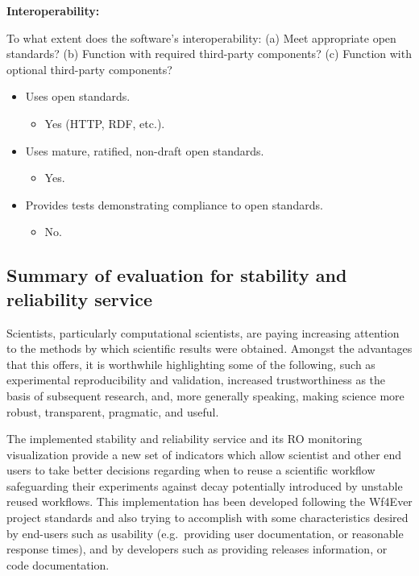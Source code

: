 \textbf{Interoperability:}

To what extent does the software's interoperability: (a) Meet
appropriate open standards? (b) Function with required third-party
components? (c) Function with optional third-party components?

\begin{itemize}
\itemsep1pt\parskip0pt
\item
  Uses open standards.

  \begin{itemize}
  \itemsep1pt\parskip0pt
  \item
    Yes (HTTP, RDF, etc.).
  \end{itemize}
\item
  Uses mature, ratified, non-draft open standards.

  \begin{itemize}
  \itemsep1pt\parskip0pt
  \item
    Yes.
  \end{itemize}
\item
  Provides tests demonstrating compliance to open standards.

  \begin{itemize}
  \itemsep1pt\parskip0pt
  \item
    No.
  \end{itemize}
\end{itemize}

\subsection{Summary of evaluation for stability and reliability service}

Scientists, particularly computational scientists, are paying increasing
attention to the methods by which scientific results were obtained.
Amongst the advantages that this offers, it is worthwhile highlighting
some of the following, such as experimental reproducibility and
validation, increased trustworthiness as the basis of subsequent
research, and, more generally speaking, making science more robust,
transparent, pragmatic, and useful.

The implemented stability and reliability service and its RO monitoring
visualization provide a new set of indicators which allow scientist and
other end users to take better decisions regarding when to reuse a
scientific workflow safeguarding their experiments against decay
potentially introduced by unstable reused workflows. This implementation
has been developed following the Wf4Ever project standards and also
trying to accomplish with some characteristics desired by end-users such
as usability (e.g.~providing user documentation, or reasonable response
times), and by developers such as providing releases information, or
code documentation.

